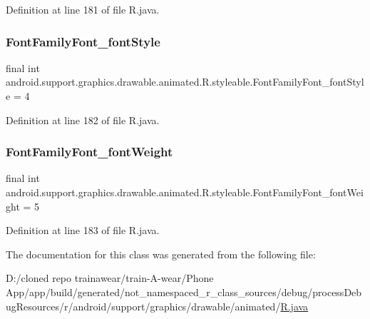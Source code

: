 Definition at line 181 of file R.\+java.

\mbox{\label{classandroid_1_1support_1_1graphics_1_1drawable_1_1animated_1_1_r_1_1styleable_a638b775651df13e5da3be65e17051488}} 
\subsubsection{\texorpdfstring{FontFamilyFont\_fontStyle}{FontFamilyFont\_fontStyle}}
{\footnotesize\ttfamily final int android.\+support.\+graphics.\+drawable.\+animated.\+R.\+styleable.\+Font\+Family\+Font\+\_\+font\+Style = 4\hspace{0.3cm}{\ttfamily [static]}}



Definition at line 182 of file R.\+java.

\mbox{\label{classandroid_1_1support_1_1graphics_1_1drawable_1_1animated_1_1_r_1_1styleable_a48249eba6fdf1b4b5c0745b92e201681}} 
\subsubsection{\texorpdfstring{FontFamilyFont\_fontWeight}{FontFamilyFont\_fontWeight}}
{\footnotesize\ttfamily final int android.\+support.\+graphics.\+drawable.\+animated.\+R.\+styleable.\+Font\+Family\+Font\+\_\+font\+Weight = 5\hspace{0.3cm}{\ttfamily [static]}}



Definition at line 183 of file R.\+java.



The documentation for this class was generated from the following file\+:\begin{DoxyCompactItemize}
\item 
D\+:/cloned repo trainawear/train-\/\+A-\/wear/\+Phone App/app/build/generated/not\+\_\+namespaced\+\_\+r\+\_\+class\+\_\+sources/debug/process\+Debug\+Resources/r/android/support/graphics/drawable/animated/\mbox{\hyperlink{process_debug_resources_2r_2android_2support_2graphics_2drawable_2animated_2_r_8java}{R.\+java}}\end{DoxyCompactItemize}
